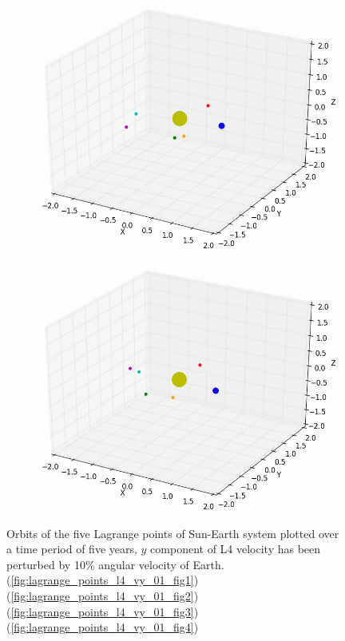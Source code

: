 \documentclass[10pt,letterpaper]{article}
\begin{document}
\begin{figure}[!htb]
  \includegraphics[width=\linewidth]{figures/lagrange_points/lagrange_points_l4_vy_01_3.png}
  \subcaption{}\label{fig:lagrange_points_l4_vy_01_fig3}
\endminipage
{}%
  \includegraphics[width=\linewidth]{figures/lagrange_points/lagrange_points_l4_vy_01_4.png}
  \subcaption{}\label{fig:lagrange_points_l4_vy_01_fig4}
\endminipage
\caption{Orbits of the five Lagrange points of Sun-Earth system plotted over a time period of five years, $y$ component of L4 velocity has been perturbed by 10$\%$ angular velocity of Earth.
(\ref{fig:lagrange_points_l4_vy_01_fig1}) 
(\ref{fig:lagrange_points_l4_vy_01_fig2}) 
(\ref{fig:lagrange_points_l4_vy_01_fig3}) 
(\ref{fig:lagrange_points_l4_vy_01_fig4})}\label{fig:lagrange_points_l4_vy_01}
\end{figure}
\end{document}
